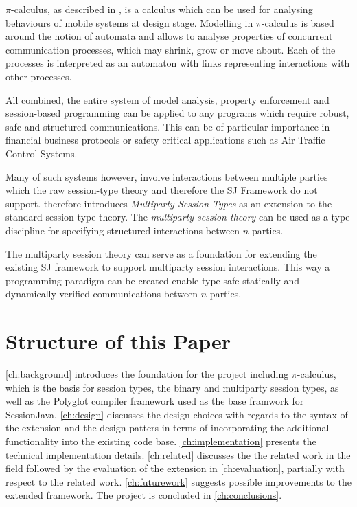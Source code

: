 $\pi$-calculus, as described in \cite{pi-calculus}, is a calculus which can be used for analysing behaviours of mobile systems at design stage. Modelling in $\pi$-calculus is based around the notion of automata and allows to analyse properties of concurrent communication processes, which may shrink, grow or move about. Each of the processes is interpreted as an automaton with links representing interactions with other processes.

All combined, the entire system of model analysis, property enforcement and session-based programming can be applied to any programs which require robust, safe and structured communications. This can be of particular importance in financial business protocols or safety critical applications such as Air Traffic Control Systems.

Many of such systems however, involve interactions between multiple parties which the raw session-type theory and therefore the SJ Framework do not support. \cite{multiparty_sess_types} therefore introduces \textit{Multiparty Session Types} as an extension to the standard session-type theory. The \textit{multiparty session theory} can be used as a type discipline for specifying structured interactions between $n$ parties.

The multiparty session theory can serve as a foundation for extending the existing SJ framework to support multiparty session interactions. This way a programming paradigm can be created enable type-safe statically and dynamically verified communications between $n$ parties. 

\section{Structure of this Paper}

\autoref{ch:background} introduces the foundation for the project including $\pi$-calculus, which is the basis for session types, the binary and multiparty session types, as well as the Polyglot compiler framework used as the base framwork for SessionJava. \autoref{ch:design} discusses the design choices with regards to the syntax of the extension and the design patters in terms of incorporating the additional functionality into the existing code base. \autoref{ch:implementation} presents the technical implementation details. \autoref{ch:related} discusses the the related work in the field followed by the evaluation of the extension in \autoref{ch:evaluation}, partially with respect to the related work. \autoref{ch:futurework} suggests possible improvements to the extended framework. The project is concluded in \autoref{ch:conclusions}.


